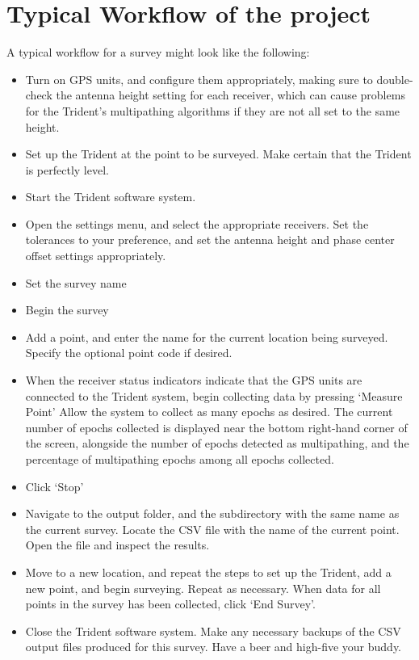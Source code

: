 \documentclass[12pt]{article}
\begin{document}
\section{Typical Workflow of the project}
A typical workflow for a survey might look like the following:
\begin{itemize}
\item Turn on GPS units, and configure them appropriately, making sure to double-check the antenna height setting for each receiver, which can cause problems for the Trident’s multipathing algorithms if they are not all set to the same height.
\item Set up the Trident at the point to be surveyed. Make certain that the Trident is perfectly level.
\item Start the Trident software system.
\item Open the settings menu, and select the appropriate receivers. Set the tolerances to your preference, and set the antenna height and phase center offset settings appropriately.
\item Set the survey name
\item Begin the survey
\item Add a point, and enter the name for the current location being surveyed. Specify the optional point code if desired.
\item When the receiver status indicators indicate that the GPS units are connected to the Trident system, begin collecting data by pressing ‘Measure Point’
Allow the system to collect as many epochs as desired. The current number of epochs collected is displayed near the bottom right-hand corner of the screen, alongside the number of epochs detected as multipathing, and the percentage of multipathing epochs among all epochs collected.
\item Click ‘Stop’
\item Navigate to the output folder, and the subdirectory with the same name as the current survey. Locate the CSV file with the name of the current point. Open the file and inspect the results.
\item Move to a new location, and repeat the steps to set up the Trident, add a new point, and begin surveying. Repeat as necessary. When data for all points in the survey has been collected, click ‘End Survey’.
\item Close the Trident software system. Make any necessary backups of the CSV output files produced for this survey. Have a beer and high-five your buddy.
\end{itemize}
\end{document}
